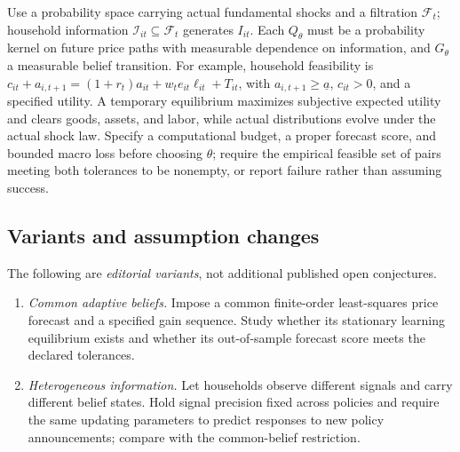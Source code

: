 \documentclass[11pt,a4paper]{article}
\begin{document}
Use a probability space carrying actual fundamental shocks and a filtration \(\mathcal F_t\); household information \(\mathcal I_{it}\subseteq\mathcal F_t\) generates \(I_{it}\). Each \(Q_\theta\) must be a probability kernel on future price paths with measurable dependence on information, and \(G_\theta\) a measurable belief transition. For example, household feasibility is \(c_{it}+a_{i,t+1}=(1+r_t)a_{it}+w_te_{it}\ell_{it}+T_{it}\), with \(a_{i,t+1}\ge\underline a\), \(c_{it}>0\), and a specified utility. A temporary equilibrium maximizes subjective expected utility and clears goods, assets, and labor, while actual distributions evolve under the actual shock law. Specify a computational budget, a proper forecast score, and bounded macro loss before choosing \(\theta\); require the empirical feasible set of pairs meeting both tolerances to be nonempty, or report failure rather than assuming success.
\subsection*{Variants and assumption changes}
The following are \emph{editorial variants}, not additional published open conjectures.
\begin{enumerate}
\item \emph{Common adaptive beliefs.} Impose a common finite-order least-squares price forecast and a specified gain sequence. Study whether its stationary learning equilibrium exists and whether its out-of-sample forecast score meets the declared tolerances.
\item \emph{Heterogeneous information.} Let households observe different signals and carry different belief states. Hold signal precision fixed across policies and require the same updating parameters to predict responses to new policy announcements; compare with the common-belief restriction.
\end{enumerate}
\end{document}
